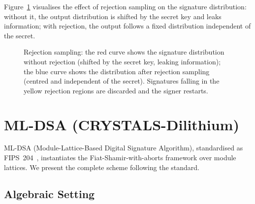 Figure~\ref{fig:ch08-rejection-sampling} visualises the effect of rejection sampling on the signature distribution: without it, the output distribution is shifted by the secret key and leaks information; with rejection, the output follows a fixed distribution independent of the secret.

\begin{figure}[t]
\centering
{}
\caption{Rejection sampling: the red curve shows the signature distribution without rejection (shifted by the secret key, leaking information); the blue curve shows the distribution after rejection sampling (centred and independent of the secret).  Signatures falling in the yellow rejection regions are discarded and the signer restarts.}
\label{fig:ch08-rejection-sampling}
\end{figure}


\section{ML-DSA (CRYSTALS-Dilithium)}
\label{sec:ml-dsa}

ML-DSA (Module-Lattice-Based Digital Signature Algorithm), standardised as FIPS~204~\cite{FIPS204}, instantiates the Fiat-Shamir-with-aborts framework over module lattices.  We present the complete scheme following the standard.

\subsection{Algebraic Setting}
\label{subsec:ml-dsa-setting}

